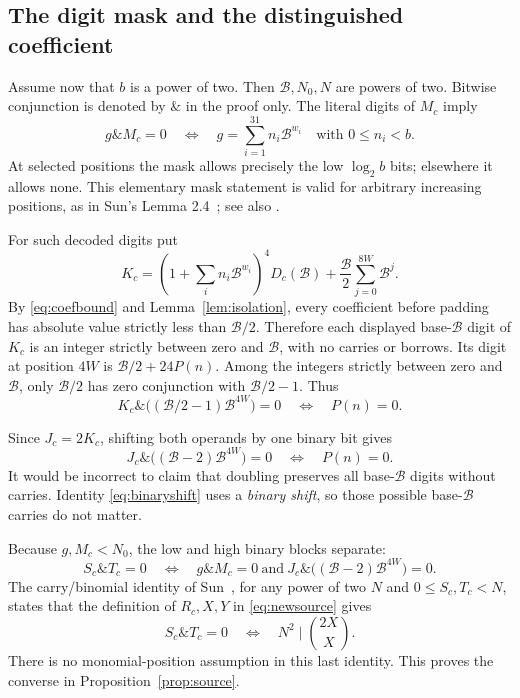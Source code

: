 \documentclass[11pt,letterpaper]{article}
\newcommand{\B}{\mathcal B}
\newcommand{\bitand}{\mathbin{\&}}
\theoremstyle{remark}
\begin{document}
\subsection{The digit mask and the distinguished coefficient}

Assume now that \(b\) is a power of two. Then \(\B,N_0,N\) are powers
of two. Bitwise conjunction is denoted by \(\bitand\) in the proof
only. The literal digits of \(M_c\) imply
\[
g\bitand M_c=0
\quad\Longleftrightarrow\quad
g=\sum_{i=1}^{31}n_i\B^{w_i}\quad\text{with }0\le n_i<b.
\]
At selected positions the mask allows precisely the low
\(\log_2 b\) bits; elsewhere it allows none. This elementary mask
statement is valid for arbitrary increasing positions, as in
Sun's Lemma 2.4~\cite{sun2021}; see also \cite{bayer2026}.

For such decoded digits put
\[
K_c=
\left(1+\sum_i n_i\B^{w_i}\right)^4D_c(\B)
+\frac{\B}{2}\sum_{j=0}^{8W}\B^j.
\]
By \eqref{eq:coefbound} and Lemma~\ref{lem:isolation}, every coefficient
before padding has absolute value strictly less than \(\B/2\).
Therefore each displayed base-\(\B\) digit of \(K_c\) is an integer
strictly between zero and \(\B\), with no carries or borrows.
Its digit at position \(4W\) is \(\B/2+24P(n)\).
Among the integers strictly between zero and \(\B\), only \(\B/2\)
has zero conjunction with \(\B/2-1\). Thus
\[
K_c\bitand\bigl((\B/2-1)\B^{4W}\bigr)=0
\quad\Longleftrightarrow\quad P(n)=0.
\]

Since \(J_c=2K_c\), shifting both operands by one binary bit gives
\begin{equation}
J_c\bitand\bigl((\B-2)\B^{4W}\bigr)=0
\quad\Longleftrightarrow\quad P(n)=0.
\label{eq:binaryshift}
\end{equation}
It would be incorrect to claim that doubling preserves all base-\(\B\)
digits without carries. Identity \eqref{eq:binaryshift} uses a
\emph{binary shift}, so those possible base-\(\B\) carries do not matter.

Because \(g,M_c<N_0\), the low and high binary blocks separate:
\[
S_c\bitand T_c=0
\quad\Longleftrightarrow\quad
g\bitand M_c=0
\ \text{and}\
J_c\bitand\bigl((\B-2)\B^{4W}\bigr)=0.
\]
The carry/binomial identity of Sun~\cite[Lemma 2.2]{sun2021}, for any
power of two \(N\) and \(0\le S_c,T_c<N\), states that the definition of
\(R_c,X,Y\) in \eqref{eq:newsource} gives
\[
S_c\bitand T_c=0
\quad\Longleftrightarrow\quad
N^2\mid\binom{2X}{X}.
\]
There is no monomial-position assumption in this last identity.
This proves the converse in Proposition~\ref{prop:source}.
\end{document}
